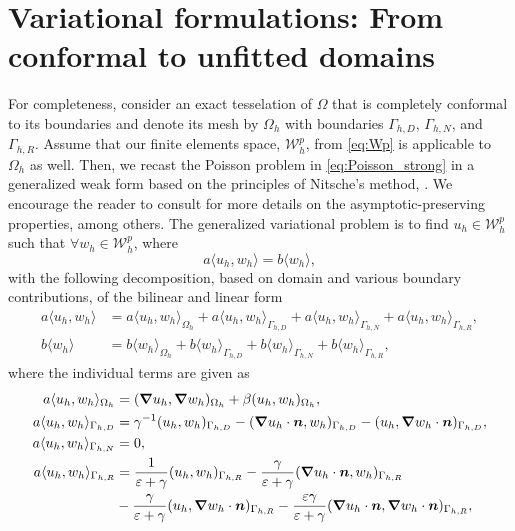 \documentclass{article}
\begin{document}
\section{Variational formulations: From conformal to unfitted domains}\label{sec:var_forms}

For completeness, consider an exact tesselation of $\Omega$ that is completely conformal to its boundaries and denote its mesh by $\Omega_h$ with boundaries $\Gamma_{h,D}$, $\Gamma_{h,N}$, and $\Gamma_{h,R}$. Assume that our finite elements space, $\mathcal{W}_h^p$, from \eqref{eq:Wp} is applicable to $\Omega_h$ as well. Then, we recast the Poisson problem in \eqref{eq:Poisson_strong} in a generalized weak form based on the principles of Nitsche's method, \cite{Nitsche1971,juntunen2009nitsche,benzaken2024constructing,visbech2025spectral}. We encourage the reader to consult \cite{visbech2025spectral} for more details on the asymptotic-preserving properties, among others. The generalized variational problem is to find $u_h \in \mathcal{W}^p_h$ such that $\forall w_h \in\mathcal{W}^p_h$, where
\begin{equation}
    a \langle u_h,w_h \rangle = b\langle w_h \rangle,
\end{equation}
with the following decomposition, based on domain and various boundary contributions, of the bilinear and linear form
\begin{subequations}
\begin{align}
     a \langle u_h,w_h \rangle &= a\langle u_h,w_h \rangle_{\Omega_h} + a\langle u_h,w_h \rangle_{\Gamma_{h,D}} + a \langle u_h,w_h \rangle_{\Gamma_{h,N}} + a \langle u_h,w_h \rangle_{\Gamma_{h,R}}, \\
     b\langle w_h \rangle &= b\langle w_h \rangle_{\Omega_h} + b\langle w_h \rangle_{\Gamma_{h,D}} + b \langle w_h \rangle_{\Gamma_{h,N}} + b\langle w_h \rangle_{\Gamma_{h,R}},
\end{align}
\end{subequations}
where the individual terms are given as
\begin{subequations}
\begin{align}
    a\langle u_h,w_h \rangle_{\Omega_h} &= (\boldsymbol{\nabla} u_h, \boldsymbol{\nabla} w_h)_{\Omega_h} + \beta  ( u_h,  w_h)_{\Omega_h},  \\ 
    a\langle u_h,w_h \rangle_{\Gamma_{h,D}} &= \gamma^{-1} (u_h,w_h)_{\Gamma_{h,D}} - (\boldsymbol{\nabla} u_h \cdot \boldsymbol{n},w_h)_{\Gamma_{h,D}} -(u_h,\boldsymbol{\nabla} w_h \cdot \boldsymbol{n})_{\Gamma_{h,D}},  \\
    a \langle u_h,w_h \rangle_{\Gamma_{h,N}} &= 0, \\
    a \langle u_h,w_h \rangle_{\Gamma_{h,R}} &= \frac{1}{\varepsilon + \gamma} (u_h,w_h)_{\Gamma_{h,R}} 
    - \frac{\gamma}{\varepsilon + \gamma} (\boldsymbol{\nabla} u_h \cdot \boldsymbol{n},w_h)_{\Gamma_{h,R}} \notag \\
    & - \frac{\gamma}{\varepsilon + \gamma} (u_h,\boldsymbol{\nabla} w_h \cdot \boldsymbol{n})_{\Gamma_{h,R}}
    - \frac{\varepsilon\gamma}{\varepsilon + \gamma} (\boldsymbol{\nabla} u_h \cdot \boldsymbol{n},\boldsymbol{\nabla} w_h \cdot \boldsymbol{n})_{\Gamma_{h,R}} ,   
\end{align}
\end{subequations}
\end{document}
